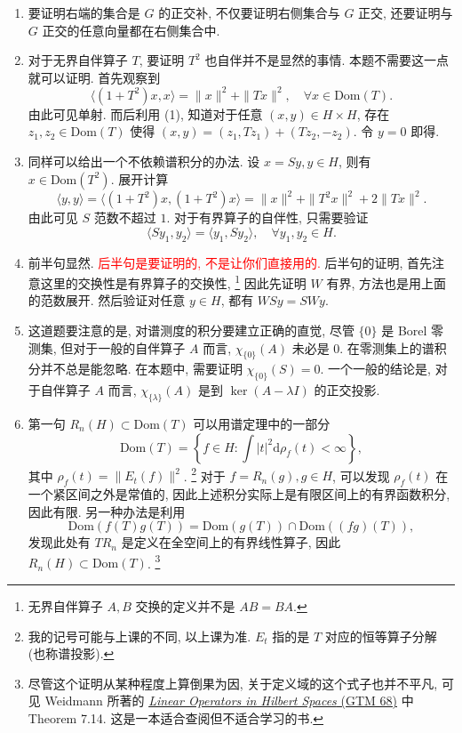 \begin{enumerate}
    \item[(1)] 要证明右端的集合是 $G$ 的正交补, 
    不仅要证明右侧集合与 $G$ 正交, 还要证明与 $G$ 正交的任意向量都在右侧集合中.
    \item[(2)] 对于无界自伴算子 $T$, 要证明 $T^2$ 也自伴并不是显然的事情. 
    本题不需要这一点就可以证明. 首先观察到
    $$\langle (1+T^2)x,x\rangle=\|x\|^2+\|Tx\|^2,\quad\forall x\in\mathrm{Dom}(T).$$ 由此可见单射. 
    而后利用 (1), 知道对于任意 $(x,y)\in H\times H$,
    存在 $z_1,z_2\in\mathrm{Dom}(T)$ 使得 $(x,y)=(z_1,Tz_1)+(Tz_2,-z_2)$. 令 $y=0$ 即得.
    \item[(3)] 同样可以给出一个不依赖谱积分的办法. 设 $x=Sy,y\in H$, 则有 $x\in\mathrm{Dom}(T^2)$. 展开计算
    $$\langle y,y\rangle=\langle (1+T^2)x,(1+T^2)x\rangle=\|x\|^2+\|T^2x\|^2+2\|Tx\|^2. $$
    由此可见 $S$ 范数不超过 $1$.
    对于有界算子的自伴性, 只需要验证 $$\langle Sy_1,y_2\rangle=\langle y_1,Sy_2\rangle,\quad\forall y_1,y_2\in H.$$
    \item[(4)] 前半句显然. \textcolor{red}{后半句是要证明的, 不是让你们直接用的.} 
    后半句的证明, 首先注意这里的交换性是有界算子的交换性, \footnote{无界自伴算子 $A,B$ 交换的定义并不是 $AB=BA$.} 
    因此先证明 $W$ 有界, 方法也是用上面的范数展开. 然后验证对任意 $y\in H$, 都有 $WSy=SWy$.
    \item[(5)] 这道题要注意的是, 对谱测度的积分要建立正确的直觉, 
    尽管 $\{0\}$ 是 Borel 零测集, 但对于一般的自伴算子 $A$ 而言, $\chi_{\{0\}}(A)$ 未必是 $0$. 
    在零测集上的谱积分并不总是能忽略. 在本题中, 需要证明 $\chi_{\{0\}}(S)=0$. 
    一个一般的结论是, 对于自伴算子 $A$ 而言, $\chi_{\{\lambda\}}(A)$ 是到 $\ker(A-\lambda I)$ 的正交投影.
    \item[(6)] 第一句 $R_n(H)\subset \mathrm{Dom}(T)$ 可以用谱定理中的一部分 
    $$\mathrm{Dom}(T)=\left\{f\in H:\int |t|^2\mathrm{d}\rho_f(t)<\infty\right\},$$ 
    其中 $\rho_f(t)=\|E_t(f)\|^2$. \footnote{我的记号可能与上课的不同, 以上课为准. 
    $E_t$ 指的是 $T$ 对应的恒等算子分解 (也称谱投影).}
    对于 $f=R_n(g),g\in H$, 可以发现 $\rho_f(t)$ 在一个紧区间之外是常值的, 
    因此上述积分实际上是有限区间上的有界函数积分, 因此有限. 
    另一种办法是利用 $$\mathrm{Dom}(f(T)g(T))=\mathrm{Dom}(g(T))\cap\mathrm{Dom}((fg)(T)),$$ 
    发现此处有 $TR_n$ 是定义在全空间上的有界线性算子, 
    因此 $R_n(H)\subset\mathrm{Dom}(T)$.
    \footnote{尽管这个证明从某种程度上算倒果为因, 关于定义域的这个式子也并不平凡, 
    可见 Weidmann 所著的 \href{https://link.springer.com/book/10.1007/978-1-4612-6027-1}{\textit{Linear Operators in Hilbert Spaces} (GTM 68)} 中 Theorem 7.14. 这是一本适合查阅但不适合学习的书.}


\end{enumerate}
